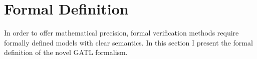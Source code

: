 \section{Formal Definition}\label{sec:activity-formal-definition}

\newcommand{\inflows}[1]{\delta(#1)}
\newcommand{\outflows}[1]{\Delta(#1)}
\newcommand{\sourcepin}[1]{\phi(#1)}
\newcommand{\targetpin}[1]{\Phi(#1)}
\newcommand{\sourcenode}[1]{\theta(#1)}
\newcommand{\targetnode}[1]{\Theta(#1)}

In order to offer mathematical precision, formal verification methods require formally defined models with clear semantics. In this section I present the formal definition of the novel GATL formalism.

